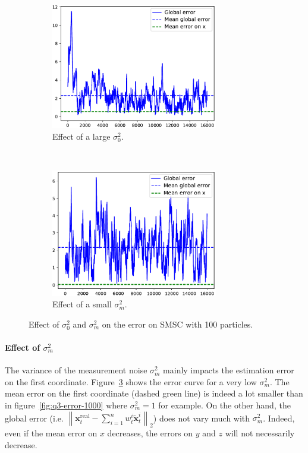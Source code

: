 \documentclass[english, DIV=13]{scrartcl}
\newcommand\norm[1]{\left\lVert#1\right\rVert}
\begin{document}
\begin{figure}
    \centering
    \begin{subfigure}{0.49\textwidth}
        \centering
        \includegraphics[width=0.8\textwidth]{figures/error-100-s0-high}
        \caption{Effect of a large $\sigma^2_0$.}
        \label{fig:error-100-s0-high}
    \end{subfigure}%
    ~
    \begin{subfigure}{0.49\textwidth}
        \centering
        \includegraphics[width=0.8\textwidth]{figures/error-100-sm-low}
        \caption{Effect of a small $\sigma^2_m$.}
        \label{fig:error-100-sm-low}
    \end{subfigure}
    \caption{Effect of $\sigma^2_0$ and $\sigma^2_m$ on the error on SMSC with
    100 particles.}
\end{figure}

\paragraph{Effect of $\sigma^2_m$}
The variance of the measurement noise $\sigma^2_m$ mainly impacts the estimation error on
the first coordinate. Figure~\ref{fig:error-100-sm-low} shows the error curve for a very
low $\sigma^2_m$. The mean error on the first coordinate (dashed green line) is indeed
a lot smaller than in figure~\ref{fig:q3-error-1000} where $\sigma^2_m = 1$ for example.
On the other hand, the global error (i.e. $\norm{\mathbf{x}_t^{\text{real}} -
\sum_{i=1}^n w_t^i\tilde{\mathbf{x}}_t^i}_2$) does not vary much with $\sigma^2_m$.
Indeed, even if the mean error on $x$ decreases, the errors on $y$ and $z$ will not
necessarily decrease.
\end{document}

